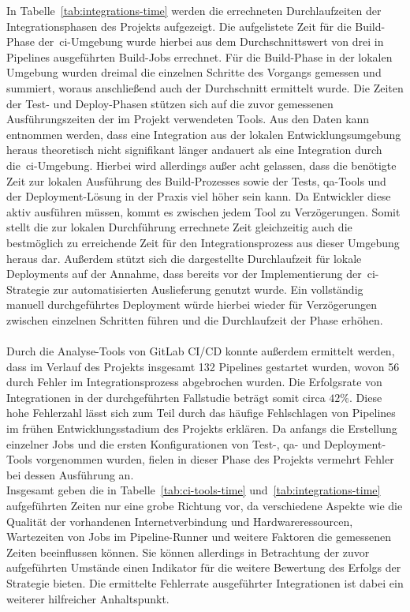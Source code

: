 In Tabelle\ \ref{tab:integrations-time} werden die errechneten Durchlaufzeiten der Integrationsphasen des Projekts
aufgezeigt.
Die aufgelistete Zeit für die Build-Phase der\ \acrshort{ci}-Umgebung wurde hierbei aus dem Durchschnittswert von drei
in Pipelines ausgeführten Build-Jobs errechnet.
Für die Build-Phase in der lokalen Umgebung wurden dreimal die einzelnen Schritte des Vorgangs gemessen und
summiert, woraus anschließend auch der Durchschnitt ermittelt wurde.
Die Zeiten der Test- und Deploy-Phasen stützen sich auf die zuvor gemessenen Ausführungszeiten der im Projekt
verwendeten Tools.
Aus den Daten kann entnommen werden, dass eine Integration aus der lokalen Entwicklungsumgebung heraus theoretisch
nicht signifikant länger andauert als eine Integration durch die\ \acrshort{ci}-Umgebung.
Hierbei wird allerdings außer acht gelassen, dass die benötigte Zeit zur lokalen Ausführung des Build-Prozesses sowie
der Tests, \acrshort{qa}-Tools und der Deployment-Lösung in der Praxis viel höher sein kann.
Da Entwickler diese aktiv ausführen müssen, kommt es zwischen jedem Tool zu Verzögerungen.
Somit stellt die zur lokalen Durchführung errechnete Zeit gleichzeitig auch die bestmöglich zu erreichende Zeit für
den Integrationsprozess aus dieser Umgebung heraus dar.
Außerdem stützt sich die dargestellte Durchlaufzeit für lokale Deployments auf der Annahme, dass 
bereits vor der Implementierung der\ \acrshort{ci}-Strategie zur automatisierten Auslieferung genutzt wurde.
Ein vollständig manuell durchgeführtes Deployment würde hierbei wieder für Verzögerungen zwischen einzelnen Schritten
führen und die Durchlaufzeit der Phase erhöhen.
\\\\
Durch die Analyse-Tools von GitLab CI/CD konnte außerdem ermittelt werden, dass im Verlauf des Projekts insgesamt 132
Pipelines gestartet wurden, wovon 56 durch Fehler im Integrationsprozess abgebrochen wurden.
Die Erfolgsrate von Integrationen in der durchgeführten Fallstudie beträgt somit circa $42\%$.
Diese hohe Fehlerzahl lässt sich zum Teil durch das häufige Fehlschlagen von Pipelines im frühen Entwicklungsstadium
des Projekts erklären.
Da anfangs die Erstellung einzelner Jobs und die ersten Konfigurationen von Test-, \acrshort{qa}- und
Deployment-Tools vorgenommen wurden, fielen in dieser Phase des Projekts vermehrt Fehler bei dessen Ausführung an.
\\
Insgesamt geben die in Tabelle\ \ref{tab:ci-tools-time} und\ \ref{tab:integrations-time} aufgeführten Zeiten
nur eine grobe Richtung vor, da verschiedene Aspekte wie die Qualität der vorhandenen Internetverbindung und
Hardwareressourcen, Wartezeiten von Jobs im Pipeline-Runner und weitere Faktoren die gemessenen Zeiten beeinflussen
können.
Sie können allerdings in Betrachtung der zuvor aufgeführten Umstände einen Indikator für die weitere Bewertung des
Erfolgs der Strategie bieten.
Die ermittelte Fehlerrate ausgeführter Integrationen ist dabei ein weiterer hilfreicher Anhaltspunkt.

